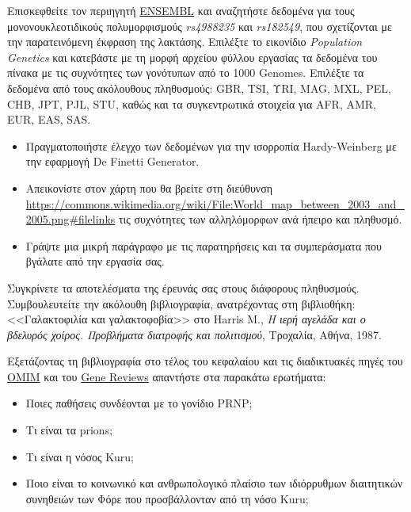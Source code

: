 \begin{refsection}
\begin{exercises}[Εργασίες]
\item Επισκεφθείτε τον περιηγητή  \href{http://www.ensembl.org}{ENSEMBL} και αναζητήστε δεδομένα για τους μονονουκλεοτιδικούς πολυμορφισμούς \textit{rs4988235} και \textit{rs182549}, που σχετίζονται με την παρατεινόμενη έκφραση της λακτάσης. Επιλέξτε το εικονίδιο \textit{Population Genetics} και κατεβάστε με τη μορφή αρχείου φύλλου εργασίας τα δεδομένα του πίνακα με τις συχνότητες των γονότυπων από το 1000 Genomes. Επιλέξτε τα δεδομένα από τους ακόλουθους πληθυσμούς: GBR, TSI, ΥRI, MAG, MXL, PEL, CHB, JPT, PJL, STU, καθώς και τα συγκεντρωτικά στοιχεία για AFR, AMR, EUR, EAS, SAS.
\begin{itemize}
\item Πραγματοποιήστε έλεγχο των δεδομένων για την ισορροπία Hardy-Weinberg με την εφαρμογή De Finetti Generator.
\item Απεικονίστε στον χάρτη που θα βρείτε στη διεύθυνση \url{https://commons.wikimedia.org/wiki/File:World_map_between_2003_and_2005.png#filelinks} τις συχνότητες των αλληλόμορφων ανά ήπειρο και πληθυσμό.
\item Γράψτε μια μικρή παράγραφο με τις παρατηρήσεις και τα συμπεράσματα που βγάλατε από την εργασία σας.
\end{itemize}
\begin{writesolutionsII}
Συγκρίνετε τα αποτελέσματα της έρευνάς σας στους διάφορους πληθυσμούς. Συμβουλευτείτε την ακόλουθη βιβλιογραφία, ανατρέχοντας στη βιβλιοθήκη:
<<Γαλακτοφιλία και γαλακτοφοβία>> στο Harris M., \textit{Η ιερή αγελάδα και ο βδελυρός χοίρος. Προβλήματα διατροφής και πολιτισμού}, Τροχαλία, Αθήνα, 1987.
\end{writesolutionsII}
\item Εξετάζοντας τη βιβλιογραφία στο τέλος του κεφαλαίου και τις διαδικτυακές πηγές του  \href{http://omim.org}{OMIM} και του \href{http://www.ncbi.nlm.nih.gov/books/NBK1116/}{Gene Reviews} απαντήστε στα παρακάτω ερωτήματα:
\begin {itemize}
\item Ποιες παθήσεις συνδέονται με το γονίδιο PRNP;
\item Τι είναι τα prions;
\item Τι είναι η νόσος Kuru;
\item Ποιο είναι το κοινωνικό και ανθρωπολογικό πλαίσιο των ιδιόρρυθμων διαιτητικών συνηθειών των Φόρε που προσβάλλονταν από τη νόσο Kuru;

\end{itemize}
\end{exercises}
\end{refsection}
